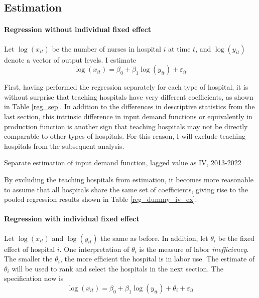 \documentclass[12pt]{article}
\begin{document}
\subsection{Estimation}

\paragraph{Regression without individual fixed effect}

Let $\log(x_{it})$ be the number of nurses in hospital $i$ at time $t$, and
$\log(y_{it})$ denote a vector of output levels. I estimate
\begin{equation}
    \log(x_{it}) = \beta_0 + \beta_1 \log(y_{it}) + \varepsilon_{it}
\end{equation}

First, having performed the regression separately for each type of hospital, it
is without surprise that teaching hospitals have very different coefficients,
as shown in Table \ref{reg_sep}. In addition to the differences in descriptive
statistics from the last section, this intrinsic difference in input demand
functions or equivalently in production function is another sign that teaching
hospitals may not be directly comparable to other types of hospitals. For this
reason, I will exclude teaching hospitals from the subsequent analysis.

\begin{table}
    \centering
    
    \caption{Separate estimation of input demand function, lagged value as IV, 2013-2022}
    \label{reg_sep}
\end{table}

By excluding the teaching hospitals from estimation, it becomes more reasonable
to assume that all hospitals share the same set of coefficients, giving rise to
the pooled regression results shown in Table \ref{reg_dummy_iv_ex}.
\begin{table}
    \centering
    
    \label{reg_dummy_iv_ex}
\end{table}

\paragraph{Regression with individual fixed effect}

Let $\log(x_{it})$ and $\log(y_{it})$ the same as before. In addition, let
$\theta_i$ be the fixed effect of hospital $i$. One interpretation of
$\theta_i$ is the measure of labor \emph{inefficiency}. The smaller the
$\theta_i$, the more efficient the hospital is in labor use. The estimate of
$\theta_i$ will be used to rank and select the hospitals in the next section.
The specification now is
\begin{equation}
    \log(x_{it}) = \beta_0 + \beta_1 \log(y_{it}) + \theta_i+ \varepsilon_{it}
\end{equation}
\end{document}
